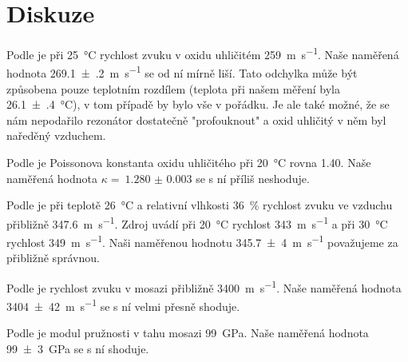 \section*{Diskuze}
Podle \cite{converter} je při \SI{25}{\degreeCelsius} rychlost zvuku v oxidu uhličitém \SI{259}{\m\per\s}.
Naše naměřená hodnota \SI{269.1(2)}{\m\per\s} se od ní mírně liší.
Tato odchylka může být způsobena pouze teplotním rozdílem (teplota při našem měření byla \SI{26.1(4)}{\degreeCelsius}), v tom případě by bylo vše v pořádku.
Je ale také možné, že se nám nepodařilo rezonátor dostatečně "profouknout" a oxid uhličitý v něm byl naředěný vzduchem.

Podle \cite{poisson} je Poissonova konstanta oxidu uhličitého při \SI{20}{\degreeCelsius} rovna \num{1.40}. Naše naměřená hodnota $\kappa =~\num{1.280(3)}$ se s ní příliš neshoduje.

Podle \cite{sengpiel} je při teplotě \SI{26}{\degreeCelsius} a relativní vlhkosti \SI{36}{\percent} rychlost zvuku ve vzduchu přibližně \SI{347.6}{\m\per\s}.
Zdroj \cite{converter} uvádí při \SI{20}{\degreeCelsius} rychlost \SI{343}{\m\per\s} a při \SI{30}{\degreeCelsius} rychlost \SI{349}{\m\per\s}.
Naši naměřenou hodnotu \SI{345,7(4)}{\m\per\s} považujeme za přibližně správnou.

Podle \cite{converter} je rychlost zvuku v mosazi přibližně \SI{3400}{\m\per\s}. Naše naměřená hodnota \SI{3404(42)}{\m\per\s} se s ní velmi přesně shoduje.

Podle \cite{modul} je modul pružnosti v tahu mosazi \SI{99}{\GPa}. Naše naměřená hodnota \SI{99(3)}{\GPa} se s ní shoduje.